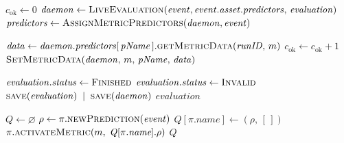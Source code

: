 \newcommand{\BlankLine}{}

\begin{algorithm}[h]
\caption{\enskip Top–level evaluation routine.}\label{alg:evaluate}
\begin{algorithmic}
    \State $c_{\mathrm{ok}} \gets 0$
    \State $\mathit{daemon} \gets \Call{LiveEvaluation}{\mathit{event},
           \mathit{event.asset.predictors},\,\mathit{evaluation}}$
    \State $\mathit{predictors} \gets \Call{AssignMetricPredictors}{\mathit{daemon},\mathit{event}}$
    \BlankLine
            \State $\mathit{data} \gets 
                   \mathit{daemon.predictors}[\,\mathit{pName}\,]
                   .\Call{getMetricData}{\mathit{runID},\,m}$
               \State $c_{\mathrm{ok}} \gets c_{\mathrm{ok}} + 1$
               \State $\Call{SetMetricData}{\mathit{daemon},\,m,\,\mathit{pName},\,\mathit{data}}$
            \EndIf
        \EndFor
    \EndFor
    \BlankLine
       \State $\mathit{evaluation.status} \gets \textsc{Finished}$
    \Else
       \State $\mathit{evaluation.status} \gets \textsc{Invalid}$
    \EndIf
    \State $\Call{save}{\mathit{evaluation}} \;\;|\;\;
            \Call{save}{\mathit{daemon}}$
    \State \Return $\mathit{evaluation}$
  \EndFunction
\end{algorithmic}
\end{algorithm}


\begin{algorithm}[h]
\caption{\enskip Assigning predictors to active metrics (method of \textsc{LiveEvaluation}).}\label{alg:assign}
\begin{algorithmic}
    \State $\mathit{Q} \gets \varnothing$ 
               \State $\rho \gets \pi.\Call{newPrediction}{\mathit{event}}$
               \State $\mathit{Q}[\pi.\textit{name}] \gets (\rho,\,[\,])$
            \EndIf
            \State $\pi.\Call{activateMetric}{m,\;\mathit{Q}[\pi.\textit{name}].\rho}$
        \EndFor
    \EndFor
    \State \Return $\mathit{Q}$
  \EndFunction
\end{algorithmic}
\end{algorithm}

